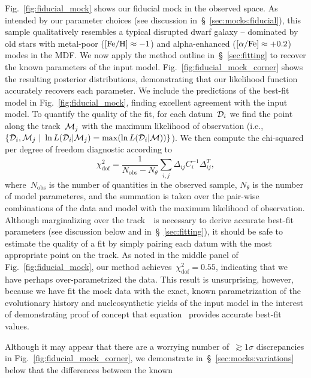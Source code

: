 \documentclass[foo.tex]{subfiles}
\begin{document}
Fig.~\ref{fig:fiducial_mock} shows our fiducial mock in the observed space.
As intended by our parameter choices (see discussion
in~\S~\ref{sec:mocks:fiducial}), this sample qualitatively resembles a typical
disrupted dwarf galaxy -- dominated by old stars with metal-poor
($\text{[Fe/H]} \approx -1$) and alpha-enhanced ($\text{[$\alpha$/Fe]} \approx +0.2$) modes in the MDF.
We now apply the method outline in~\S~\ref{sec:fitting} to recover the known
parameters of the input model.
Fig.~\ref{fig:fiducial_mock_corner} shows the resulting posterior distributions,
demonstrating that our likelihood function accurately recovers each parameter.
We include the predictions of the best-fit model in Fig.~\ref{fig:fiducial_mock},
finding excellent agreement with the input model.
To quantify the quality of the fit, for each datum~$\mathcal{D}_i$ we find the
point along the track~$\mathcal{M}_j$ with the maximum likelihood of observation
(i.e.,~$\{\mathcal{D}_i,\mathcal{M}_j~|~\ln L(\mathcal{D}_i | \mathcal{M}_j) =
\max(\ln L(\mathcal{D}_i | \mathcal{M}))\}$).
We then compute the chi-squared per degree of freedom diagnostic according to
\begin{equation}
\chi_\text{dof}^2 = \frac{1}{N_\text{obs} - N_\theta}
\sum_{i,j} \Delta_{ij} C_i^{-1} \Delta_{ij}^T,
\label{eq:chisquared_dof}
\end{equation}
where~$N_\text{obs}$ is the number of quantities in the observed sample,
$N_\theta$ is the number of model parameteres, and the summation is taken over
the pair-wise combinations of the data and model with the maximum likelihood of
observation.
Although marginalizing over the track~~is necessary to derive
accurate best-fit parameters (see discussion below and in~\S~\ref{sec:fitting}),
it should be safe to estimate the quality of a fit by simply pairing each datum
with the most appropriate point on the track.
As noted in the middle panel of Fig.~\ref{fig:fiducial_mock}, our method
achieves~$\chi_\text{dof}^2 = 0.55$, indicating that we have perhaps
over-parametrized the data.
This result is unsurprising, however, because we have fit the mock data with
the exact, known parametrization of the evolutionary history and
nucleosynthetic yields of the input model in the interest of demonstrating
proof of concept that equation~ provides accurate best-fit
values.
\par
Although it may appear that there are a worrying number of~$\gtrsim 1\sigma$
discrepancies in Fig.~\ref{fig:fiducial_mock_corner}, we demonstrate
in~\S~\ref{sec:mocks:variations} below that the differences between the known
\end{document}
